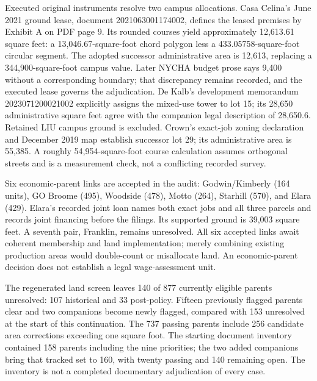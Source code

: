 Executed original instruments resolve two campus allocations. Casa Celina's
June 2021 ground lease, document 2021063001174002, defines the leased premises
by Exhibit A on PDF page 9. Its rounded courses yield approximately 12,613.61
square feet: a 13,046.67-square-foot chord polygon less a 433.05758-square-foot
circular segment. The adopted successor administrative area is 12,613,
replacing a 344,900-square-foot campus value. Later NYCHA budget prose says
9,400 without a corresponding boundary; that discrepancy remains recorded,
and the executed lease governs the adjudication. De Kalb's development
memorandum 2023071200021002 explicitly assigns the mixed-use tower to lot 15;
its 28,650 administrative square feet agree with the companion legal description
of 28,650.6. Retained LIU campus ground is excluded. Crown's exact-job zoning
declaration and December 2019 map establish successor lot 29; its administrative
area is 55,385. A roughly 54,954-square-foot course calculation assumes
orthogonal streets and is a measurement check, not a conflicting recorded survey.

Six economic-parent links are accepted in the audit: Godwin/Kimberly (164
units), GO Broome (495), Woodside (478), Motto (264), Starhill (570), and
Elara (429). Elara's recorded joint loan names both exact jobs and all three
parcels and records joint financing before the filings. Its supported ground
is 39,003 square feet. A seventh pair, Franklin, remains unresolved. All six
accepted links await coherent membership and land implementation; merely
combining existing production areas would double-count or misallocate land.
An economic-parent decision does not establish a legal wage-assessment unit.

The regenerated land screen leaves 140 of 877 currently eligible parents
unresolved: 107 historical and 33 post-policy. Fifteen previously flagged
parents clear and two companions become newly flagged, compared with 153
unresolved at the start of this continuation. The 737 passing parents include
256 candidate area corrections exceeding one square foot. The starting
document inventory contained 158 parents including the nine priorities; the
two added companions bring that tracked set to 160, with twenty passing and
140 remaining open. The
inventory is not a completed documentary adjudication of every case.

